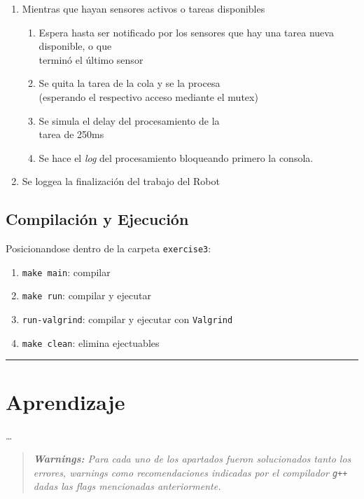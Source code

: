 \documentclass[11pt, a4paper]{article}
\begin{document}
\begin{multicols}{2}
\begin{enumerate}[label=\Roman*.]
    \item Mientras que hayan sensores activos o tareas disponibles
    \begin{enumerate}[label=\roman*.]
        \item Espera hasta ser notificado por los sensores que hay una tarea nueva disponible, o que\\terminó el último sensor
        \item Se quita la tarea de la cola y se la procesa\\(esperando el respectivo acceso mediante el mutex)
        \item Se simula el delay del procesamiento de la\\tarea de 250ms
        \item Se hace el \textit{log} del procesamiento bloqueando primero la consola.
    \end{enumerate}
    \item Se loggea la finalización del trabajo del Robot
\end{enumerate}

\subsection{Compilación y Ejecución}

Posicionandose dentro de la carpeta \lstinline|exercise3|:

\begin{enumerate}[label=\roman*.]
    \item \lstinline|make main|: compilar
    \item \lstinline|make run|: compilar y ejecutar
    \item \lstinline|run-valgrind|: compilar y ejecutar con \lstinline|Valgrind|
    \item \lstinline|make clean|: elimina ejectuables
\end{enumerate}

\end{multicols}

\rule{44em}{0.5pt}

\section*{Aprendizaje}

\dots

\begin{quote}
    \small\itshape\textbf{Warnings:} Para cada uno de los apartados fueron solucionados tanto los errores, warnings como recomendaciones
indicadas por el compilador \lstinline|g++| dadas las flags mencionadas anteriormente.
\end{quote}
\end{document}
